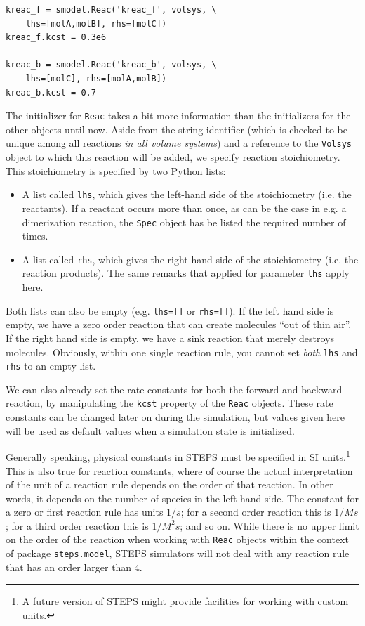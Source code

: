 \documentclass[a4paper,12pt]{book}
\begin{document}
\begin{verbatim}
kreac_f = smodel.Reac('kreac_f', volsys, \
    lhs=[molA,molB], rhs=[molC])
kreac_f.kcst = 0.3e6

kreac_b = smodel.Reac('kreac_b', volsys, \
    lhs=[molC], rhs=[molA,molB])
kreac_b.kcst = 0.7
\end{verbatim}

The initializer for \texttt{Reac} takes a bit more information than the initializers for the other objects until now. Aside from the string identifier (which is checked to be unique among all reactions \emph{in all volume systems}) and a reference to the \texttt{Volsys} object to which this reaction will be added, we specify reaction stoichiometry. This stoichiometry is specified by two Python lists: 

\begin{itemize}
\item
A list called \texttt{lhs}, which gives the left-hand side of the stoichiometry (i.e. the reactants). If a reactant occurs more than once, as can be the case in e.g. a dimerization reaction, the \texttt{Spec} object has be listed the required number of times.
\item
A list called \texttt{rhs}, which gives the right hand side of the stoichiometry (i.e. the reaction products). The same remarks that applied for parameter \texttt{lhs} apply here.
\end{itemize}

Both lists can also be empty (e.g. \texttt{lhs=[]} or \texttt{rhs=[]}). If the left hand side is empty, we have a zero order reaction that can create molecules ``out of thin air''. If the right hand side is empty, we have a sink reaction that merely destroys molecules. Obviously, within one single reaction rule, you cannot set \emph{both} \texttt{lhs} and \texttt{rhs} to an empty list.

We can also already set the rate constants for both the forward and backward reaction, by manipulating the \texttt{kcst} property of the \texttt{Reac} objects. These rate constants can be changed later on during the simulation, but values given here will be used as default values when a simulation state is initialized.

Generally speaking, physical constants in STEPS must be specified in SI units.\footnote{A future version of STEPS might provide facilities for working with custom units.} This is also true for reaction constants, where of course the actual interpretation of the unit of a reaction rule depends on the order of that reaction. In other words, it depends on the number of species in the left hand side. The constant for a zero or first reaction rule has units $1/s$; for a second order reaction this is $1/Ms$; for a third order reaction this is $1/M^2s$; and so on. While there is no upper limit on the order of the reaction when working with \texttt{Reac} objects within the context of package \texttt{steps.model}, STEPS simulators will not deal with any reaction rule that has an order larger than 4. 
\end{document}
